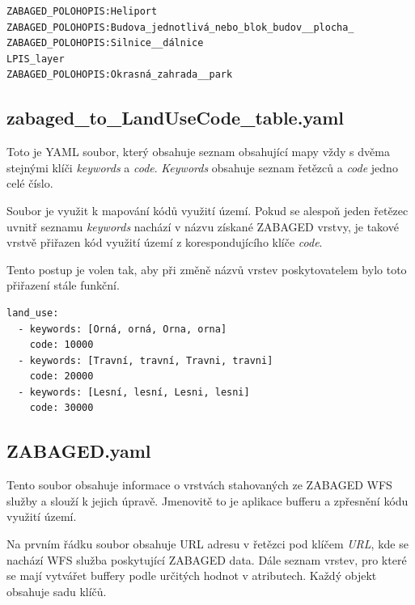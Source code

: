\documentclass[a4paper,oneside,12pt]{book}
\begin{document}
\begin{lstlisting}[style=mypython, caption={Ukázka layers\_merging\_order.csv},label={kod:layers_merging_order.csv}]
ZABAGED_POLOHOPIS:Heliport
ZABAGED_POLOHOPIS:Budova_jednotlivá_nebo_blok_budov__plocha_
ZABAGED_POLOHOPIS:Silnice__dálnice
LPIS_layer
ZABAGED_POLOHOPIS:Okrasná_zahrada__park
\end{lstlisting}

\subsection{zabaged\_to\_LandUseCode\_table.yaml} \label{zabaged_to_LandUseCode_table.yaml}
\hspace{10mm}Toto je YAML soubor, který obsahuje seznam obsahující mapy vždy s dvěma stejnými klíči \textit{keywords} a \textit{code}. \textit{Keywords} obsahuje seznam řetězců a \textit{code} jedno celé číslo.

\hspace{10mm}Soubor je využit k mapování kódů využití území. Pokud se alespoň jeden řetězec uvnitř seznamu \textit{keywords} nachází v názvu získané ZABAGED vrstvy, je takové vrstvě přiřazen kód využití území z korespondujícího klíče \textit{code}.

\hspace{10mm}Tento postup je volen tak, aby při změně názvů vrstev poskytovatelem bylo toto přiřazení stále funkční.

\begin{lstlisting}[style=myyaml, caption={Ukázka zabaged\_to\_LandUseCode\_table.yaml},label={kod:zabaged_to_LandUseCode_table.yaml}]
land_use:
  - keywords: [Orná, orná, Orna, orna]
    code: 10000
  - keywords: [Travní, travní, Travni, travni]
    code: 20000
  - keywords: [Lesní, lesní, Lesni, lesni]
    code: 30000
\end{lstlisting}

\subsection{ZABAGED.yaml} \label{ZABAGED.yaml}
\hspace{10mm} Tento soubor obsahuje informace o vrstvách stahovaných ze ZABAGED WFS služby a slouží k jejich úpravě. Jmenovitě to je aplikace bufferu a zpřesnění kódu využití území.

\hspace{10mm}Na prvním řádku soubor obsahuje URL adresu v řetězci pod klíčem \textit{URL}, kde se nachází WFS služba poskytující ZABAGED data. Dále seznam vrstev, pro které se mají vytvářet buffery podle určitých hodnot v atributech. Každý objekt obsahuje sadu klíčů.
\end{document}
